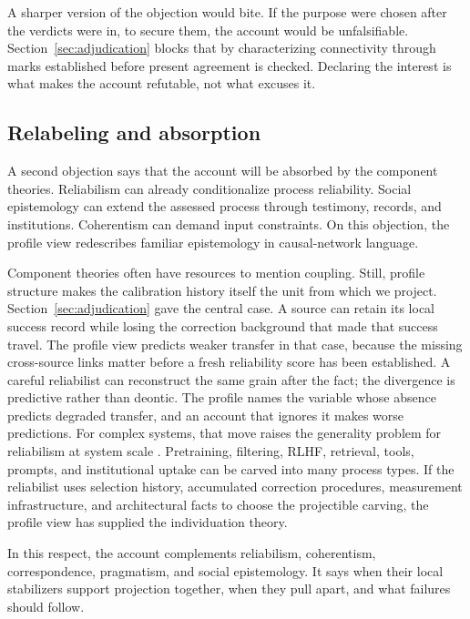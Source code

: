 \documentclass[12pt]{article}
\begin{document}
A sharper version of the objection would bite. If the purpose
were chosen after the verdicts were in, to secure them, the account would be
unfalsifiable. Section~\ref{sec:adjudication} blocks that by characterizing connectivity
through marks established before present agreement is checked. Declaring the interest is
what makes the account refutable, not what excuses it.

\subsection{Relabeling and absorption}

A second objection says that the account will be absorbed by the component theories.
Reliabilism can already conditionalize process reliability. Social epistemology can
extend the assessed process through testimony, records, and institutions. Coherentism
can demand input constraints. On this objection, the profile view redescribes familiar
epistemology in causal-network language.

Component theories often have resources to mention coupling. Still, profile structure
makes the calibration history itself the unit from which we project.
Section~\ref{sec:adjudication} gave the central case. A source can retain
its local success record while losing the correction background that made that success
travel. The profile view predicts weaker transfer in that case, because the missing
cross-source links matter before a fresh reliability score has been established.
A careful reliabilist can reconstruct the same grain after the fact; the divergence is
predictive rather than deontic. The profile names the variable whose absence predicts
degraded transfer, and an account that ignores it makes worse predictions. For complex systems, that move raises the
generality problem for reliabilism at system scale
\citep{conee_feldman_1998_generality_problem_reliabilism}.
Pretraining, filtering, RLHF, retrieval, tools, prompts, and institutional uptake can be
carved into many process types. If the reliabilist uses selection history, accumulated
correction procedures, measurement infrastructure, and architectural facts to choose the projectible
carving, the profile view has supplied the individuation theory.

In this respect, the account complements reliabilism, coherentism, correspondence,
pragmatism, and social epistemology. It says when their local stabilizers support projection together, when they
pull apart, and what failures should follow.
\end{document}
